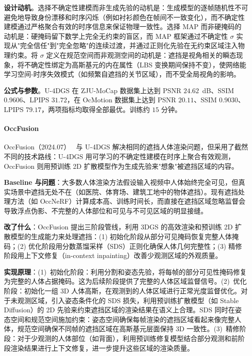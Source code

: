 \textbf{设计动机}。选择不确定性建模而非生成先验的动机是：生成模型的逐帧随机性不可避免地导致身份漂移和时序闪烁（例如衬衫颜色在帧间不一致变化），而不确定性建模通过严格聚合有效的时序信息来保证物理一致性。选择 MAP 而非硬掩码的动机是：硬掩码留下数学上完全无约束的盲区，而 MAP 框架通过不确定性 $\sigma$ 实现从"完全信任"到"完全忽略"的连续过渡，并通过正则化先验在无约束区域注入物理约束。将 $\sigma$ 定义在规范空间而非观测空间的动机是：遮挡是视角相关的瞬态现象，将不确定性绑定为高斯基元的内在属性（LBS 变换期间保持不变），使网络能学习空间-时序失效模式（如频繁自遮挡的关节区域），而不受全局视角的影响。

\textbf{公式与参数}。U-4DGS 在 ZJU-MoCap 数据集上达到 PSNR $24.62$~dB、SSIM $0.9606$、LPIPS $31.72$，在 OcMotion 数据集上达到 PSNR $20.11$、SSIM $0.9030$、LPIPS $79.17$，两项指标均取得全部最优。训练约 $15$ 分钟。

\paragraph{OccFusion}

OccFusion（2024.07）~\cite{2407_00316} 与 U-4DGS 解决相同的遮挡人体渲染问题，但采用了截然不同的技术路线：U-4DGS 用可学习的不确定性建模在时序上聚合有效观测，OccFusion 则用预训练 2D 扩散模型作为生成先验来"想象"被遮挡区域的内容。

\textbf{Baseline 与问题}：大多数人体渲染方法假设输入视频中人体始终完全可见，但真实场景中遮挡无处不在（如医院、体育场、建筑工地中的物体遮挡）。现有遮挡处理方法（如 OccNeRF）计算成本高、训练时间长，而直接在遮挡区域忽略监督会导致浮点伪影、不完整的人体部位和可见与不可见区域的明显接缝。

\textbf{改了什么}：OccFusion 提出三阶段管线，利用 3DGS 的高效渲染和预训练 2D 扩散模型的生成能力来处理遮挡：(1) 初始化阶段从部分可见掩码恢复完整人体掩码；(2) 优化阶段用分数蒸馏采样（SDS）正则化确保人体几何完整性；(3) 精修阶段用上下文修复（in-context inpainting）改善少观测区域的外观质量。

\textbf{实现原理}：(1)~初始化阶段：利用分割和姿态先验，将每帧的部分可见性掩码修复为完整的人体占据掩码。这为后续阶段提供了完整的人体区域监督信号。(2)~优化阶段：初始化一组 3D 人体高斯，在观测到的人体区域进行正常光度监督优化。对于未观测区域，引入姿态条件化的 SDS 损失，利用预训练扩散模型（如 Stable Diffusion）的 2D 先验来约束遮挡区域的渲染结果在语义上合理。SDS 同时在姿态空间和规范空间施加约束：姿态空间确保每帧渲染的遮挡区域看起来像完整人体，规范空间确保不同帧的遮挡区域在高斯基元层面保持 3D 一致性。(3)~精修阶段：对于少观测的人体部位（如背面），利用预训练修复模型结合部分观测和前阶段渲染结果进行上下文修复，进一步提升这些区域的渲染质量。

